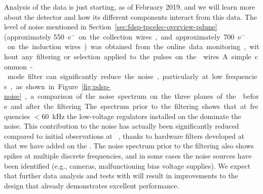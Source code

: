 Analysis of the  data
is just starting, as of February 2019, and %
we will learn more about the detector and how its different components %
interact %
from this data. The level of noise mentioned in Section~\ref{sec:fdsp-tpcelec-overview-pdune}
(approximately \SI{550}{e$^-$} on the collection wires,
and approximately \SI{700}{e$^-$} on the induction wires) 
was obtained from the online data monitoring, without any
filtering or selection applied to the pulses on the 
wires. A simple common-mode filter can significantly reduce the 
noise, particularly at low frequencies, as shown in Figure~\ref{fig:pdsp-noise},  
a comparison of the noise spectrum on the three planes of the  before and after the filtering. 
The spectrum prior to
the filtering shows %
that at %
frequencies $<$\SI{60}{kHz}  the %
low-voltage regulators %
installed on the  dominate the noise.  
This contribution to the noise has actually
been significantly reduced %
compared to
initial observations at ~\cite{Acciarri:2017sde},
thanks to hardware filters developed at  that we have%
added on the  . The noise spectrum prior to the
filtering also shows spikes at multiple discrete frequencies, and in
some cases the noise %
sources have been identified (e.g., cameras,
malfunctioning bias voltage supplies). We expect that further data analysis
and %
tests with  %
will result in improvements to the %
  design that already demonstrates excellent performance.
